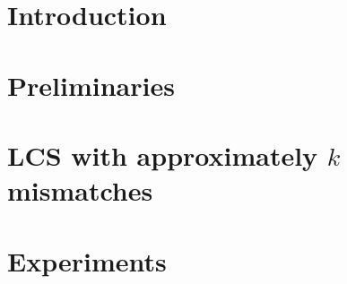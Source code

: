 \section{Introduction}\label{lcs:sec:intro}
	
\section{Preliminaries}\label{lcs:sec:prelim}

\section{LCS with approximately \texorpdfstring{$k$}{k} mismatches}\label{lcs:sec:klcs}


\section{Experiments}\label{lcs:sec:implem}

\BiblatexSplitbibDefernumbersWarningOff

\backmatter
{}
\printbibliography[heading=subbibintoc]